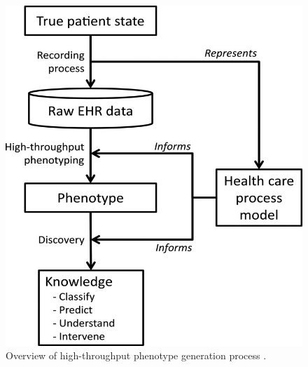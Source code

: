 \documentclass{sig-alternate-05-2015}
\begin{document}
\begin{figure} [t]
\centering
\includegraphics[width=0.75\linewidth]{example-phenotype-process.jpg}
\caption{Overview of high-throughput phenotype generation process \cite{kho_use_2012}.}
\label{fig:decomp-example}
\end{figure}

\end{document}
